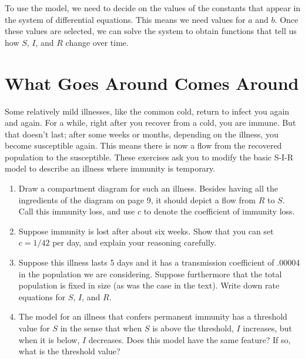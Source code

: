 \documentclass
[justified,nohyper]
{tufte-handout}
\begin{document}
To use the model, we need to decide on the values of the constants that appear
in the system of differential equations. This means we need values for $a$ and
$b$. Once these values are selected, we can solve the system to obtain functions
that tell us how $S$, $I$, and $R$ change over time.

\section{What Goes Around Comes Around}
Some relatively mild illnesses, like the common cold, return to infect you again and again. For a while, right after you recover from a cold, you are immune. But that doesn't last; after some weeks or months, depending on the illness, you become susceptible again. This means there is now a flow from the recovered population to the susceptible. These exercises ask you to modify the basic S-I-R model to describe an illness where immunity is temporary.

\begin{enumerate}
    \item Draw a compartment diagram for such an illness. Besides having all the ingredients of the diagram on page 9, it should depict a flow from $R$ to $S$. Call this immunity loss, and use $c$ to denote the coefficient of immunity loss.
    \item Suppose immunity is lost after about six weeks. Show that you can set $c = 1/42$ per day, and explain your reasoning carefully.
    \item Suppose this illness lasts 5 days and it has a transmission coefficient of .00004 in the population we are considering. Suppose furthermore that the total population is fixed in size (as was the case in the text). Write down rate equations for $S$, $I$, and $R$.
    \item The model for an illness that confers permanent immunity has a threshold value for $S$ in the sense that when $S$ is above the threshold, $I$ increases, but when it is below, $I$ decreases. Does this model have the same feature? If so, what is the threshold value?
\end{enumerate}
\end{document}
